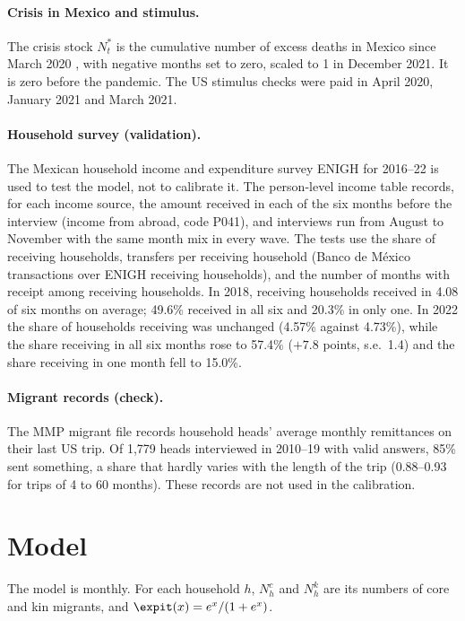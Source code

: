 \paragraph{Crisis in Mexico and stimulus.} The crisis stock $N^*_t$ is the cumulative number of excess deaths in Mexico since March 2020 \citep{karlinsky2021}, with negative months set to zero, scaled to 1 in December 2021. It is zero before the pandemic. The US stimulus checks were paid in April 2020, January 2021 and March 2021.

\paragraph{Household survey (validation).} The Mexican household income and expenditure survey ENIGH \citep{enigh} for 2016--22 is used to test the model, not to calibrate it. The person-level income table records, for each income source, the amount received in each of the six months before the interview (income from abroad, code P041), and interviews run from August to November with the same month mix in every wave. The tests use the share of receiving households, transfers per receiving household (Banco de M\'exico transactions over ENIGH receiving households), and the number of months with receipt among receiving households. In 2018, receiving households received in 4.08 of six months on average; 49.6\% received in all six and 20.3\% in only one. In 2022 the share of households receiving was unchanged (4.57\% against 4.73\%), while the share receiving in all six months rose to 57.4\% ($+7.8$ points, s.e.\ 1.4) and the share receiving in one month fell to 15.0\%.

\paragraph{Migrant records (check).} The MMP migrant file records household heads' average monthly remittances on their last US trip. Of 1,779 heads interviewed in 2010--19 with valid answers, 85\% sent something, a share that hardly varies with the length of the trip (0.88--0.93 for trips of 4 to 60 months). These records are not used in the calibration.

\section{Model}

The model is monthly. For each household $h$, $N^c_h$ and $N^k_h$ are its numbers of core and kin migrants, and $\expit(x) = e^x/(1 + e^x)$.

